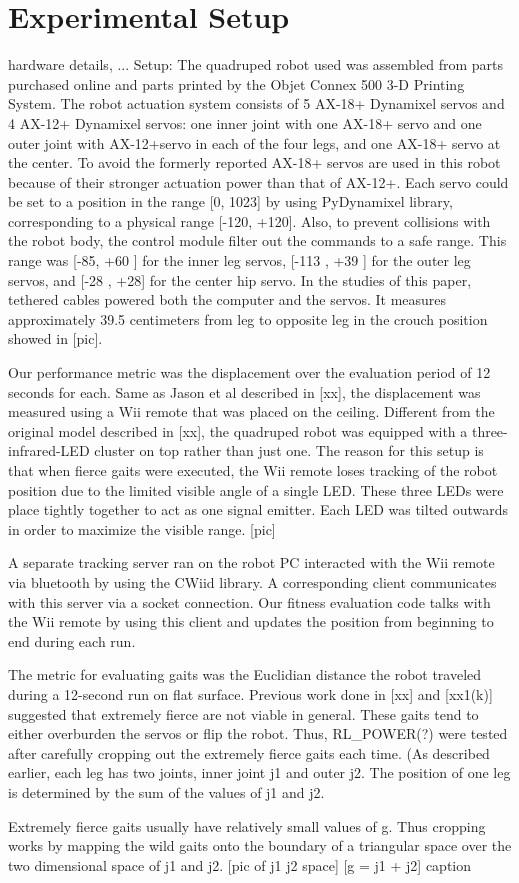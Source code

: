 \section{Experimental Setup}

hardware details, ...
Setup:
The quadruped robot used was assembled from parts purchased online and parts printed by the Objet Connex 500 3-D Printing System. The robot actuation system consists of 5 AX-18+ Dynamixel servos and 4 AX-12+ Dynamixel servos: one inner joint with one AX-18+ servo and one outer joint with AX-12+servo in each of the four legs, and one AX-18+ servo at the center. To avoid the formerly reported AX-18+ servos are used in this robot because of their stronger actuation power than that of AX-12+. Each servo could be set to a position in the range [0, 1023] by using PyDynamixel library, corresponding to a physical range [-120, +120]. Also, to prevent collisions with the robot body, the control module filter out the commands to a safe range. This range was [-85, +60 ] for the inner leg servos, [-113 , +39 ] for the outer leg servos, and [-28 , +28] for the center hip servo. In the studies of this paper, tethered cables powered both the computer and the servos. It measures approximately 39.5 centimeters from leg to opposite leg in the crouch position showed in [pic].

Our performance metric was the displacement over the evaluation period of 12 seconds for each. Same as Jason et al described in [xx], the displacement was measured using a Wii remote that was placed on the ceiling. Different from the original model described in [xx], the quadruped robot was equipped with a three-infrared-LED cluster on top rather than just one. The reason for this setup is that when fierce gaits were executed, the Wii remote loses tracking of the robot position due to the limited visible angle of a single LED.  These three LEDs were place tightly together to act as one signal emitter. Each LED was tilted outwards in order to maximize the visible range. [pic] 

A separate tracking server ran on the robot PC interacted with the Wii remote via bluetooth by using the CWiid library.  A corresponding client communicates with this server via a socket connection. Our fitness evaluation code talks with the Wii remote by using this client and updates the position from beginning to end during each run. 

The metric for evaluating gaits was the Euclidian distance the robot traveled during a 12-second run on flat surface. Previous work done in [xx] and [xx1(k)] suggested that extremely fierce are not viable in general. These gaits tend to either overburden the servos or flip the robot. Thus, RL_POWER(?) were tested after carefully cropping out the extremely fierce gaits each time. (As described earlier, each leg has two joints, inner joint j1 and outer j2. The position of one leg is determined by the sum of the values of j1 and j2. 

Extremely fierce gaits usually have relatively small values of g. Thus cropping works by mapping the wild gaits onto the boundary of a triangular space over the two dimensional space of j1 and j2. [pic of j1 j2 space] [g = j1 + j2] caption
